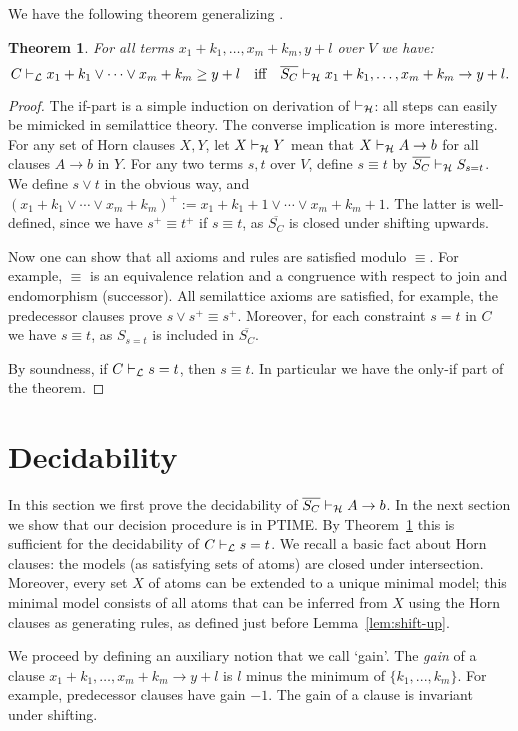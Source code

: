 \documentclass[11pt,a4paper]{article}
\newtheorem{theorem}{Theorem}[section]
\newcommand\set[1]{\{#1\}}
\newcommand\jterm[3]{{{#1_1}+{#2_1}}\vee\cdots\vee{{#1_#3}+{#2_#3}}}
\newcommand\jbody[3]{{{#1_1}+{#2_1}},\ldots,{{#1_#3}+{#2_#3}}}
\newcommand\lathy{{\cal L}}
\newcommand\prvL{\vdash_{\lathy}}
\newcommand\prvH{\vdash_{\cal H}}
\newcommand\upS[1]{\overline{S_{#1}}}
\begin{document}
We have the following theorem generalizing \cite[Theorem 3]{Lorenzen51}.

\begin{theorem}\label{thm:LvsH}
For all terms $\jbody{x}{k}{m},y+l$ over $V$ we have:
\[
C\prvL \jterm{x}{k}{m}\geq y+l 
\quad\text{iff}\quad
\upS{C}\prvH \jbody{x}{k}{m}\to y+l.
\]
\end{theorem} 
\begin{proof}
The if-part is a simple induction on derivation of $\prvH$:
all steps can easily be mimicked in semilattice theory.
The converse implication is more interesting.
For any set of Horn clauses $X,Y$, let $X \prvH Y$ mean
that $X \prvH A\to b$ for all clauses $A\to b$ in $Y$.
For any two terms $s,t$ over $V$, define $s\equiv t$ by
$\upS{C} \prvH S_{s=t}$. We define $s\vee t$ in the obvious way,
and $(\jterm{x}{k}{m})^+ := x_1+k_1+1 \vee\cdots\vee x_m+k_m+1$.
The latter is well-defined, since we have $s^+\equiv t^+$ 
if $s\equiv t$, as $\upS{C}$ is closed under shifting upwards.

Now one can show that all axioms and rules are satisfied modulo $\equiv$. 
For example, $\equiv$ is an equivalence relation and
a congruence with respect to join and endomorphism (successor).
All semilattice axioms are satisfied, for example,
the predecessor clauses prove $s\vee s^+ \equiv s^+$. 
Moreover, for each constraint $s=t$ in $C$ 
we have $s\equiv t$, as $S_{s=t}$ is included in $\upS{C}$.

By soundness, if $C\prvL s=t$, then $s\equiv t$.
In particular we have the only-if part of the theorem.
\end{proof}

\section{Decidability}\label{sec:decidability}

In this section we first prove the decidability of $\upS{C}\prvH A\to b$.
In the next section we show that our decision procedure is in PTIME. 
By Theorem~\ref{thm:LvsH} this is sufficient for
the decidability of $C\prvL s=t$. We recall a basic fact
about Horn clauses: the models (as satisfying sets of atoms)
are closed under intersection. Moreover, every set $X$ of atoms
can be extended to a unique minimal model; this minimal model
consists of all atoms that can be inferred from $X$ using the
Horn clauses as generating rules, as defined just before Lemma~\ref{lem:shift-up}. 

We proceed by defining an auxiliary notion that we call `gain'.
The \emph{gain} of a clause $\jbody{x}{k}{m}\to y+l$ is $l$ 
minus the minimum of $\set{k_1, ... ,k_m}$.
For example, predecessor clauses have gain $-1$.
The gain of a clause is invariant under shifting.
\end{document}
